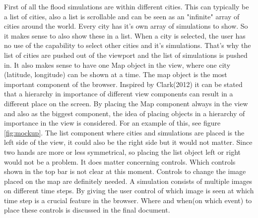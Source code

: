 First of all the flood simulations are within different cities. This can typically be a list of cities, also a list is scrollable and can be seen as an "infinite" array of cities around the world. Every city has it's own array of simulations to show. So it makes sense to also show these in a list. When a city is selected, the user has no use of the capability to select other cities and it's simulations. That's why the list of cities are pushed out of the viewport and the list of simulations is pushed in. 
It also makes sense to have one Map object in the view, where one city (latitude, longitude) can be shown at a time. The map object is the most important component of the browser. Inspired by Clark(2012) it can be stated that a hierarchy in importance of different view components can result in a different place on the screen. By placing the Map component always in the view and also as the biggest component, the idea of placing objects in a hierarchy of importance in the view is considered. For an example of this, see figure \ref{fig:mockup}.
The list component where cities and simulations are placed is the left side of the view, it could also be the right side but it would not matter. Since two hands are more or less symmetrical, so placing the list object left or right would not be a problem. It does matter concerning controls. Which controls shown in the top bar is not clear at this moment. Controls to change the image placed on the map are definitely needed. A simulation consists of multiple images on different time steps. By giving the user control of which image is seen at which time step is a crucial feature in the browser. Where and when(on which event) to place these controls is discussed in the final document.
